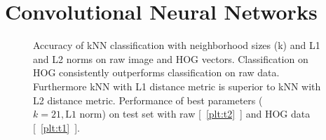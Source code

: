 \section{Convolutional Neural Networks}

\begin{figure}[h!t]
\newcommand{\plotref}[1]{{[~\ref{plt:#1}~]}}
\centering

\caption{Accuracy of kNN classification with neighborhood sizes (k) and L1 and L2 norms on raw image and HOG vectors. Classification on HOG consistently outperforms classification on raw data. Furthermore kNN with L1 distance metric is superior to kNN with L2 distance metric. Performance of best parameters ($k=21, \text{L1 norm}$) on test set with raw \plotref{t2} and HOG data \plotref{t1}. }
\label{figparam}

\end{figure}







